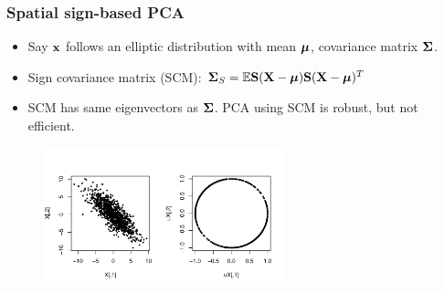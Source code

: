\documentclass[handout,10pt]{beamer}
\begin{document}

\begin{frame}
\frametitle{Spatial sign-based PCA \citep{locantore99}}
\begin{itemize}
\item Say ${\bf{x}}$ follows an elliptic distribution with mean ${\boldsymbol{\mu}}$, covariance matrix ${\boldsymbol{\Sigma}}$.
\item Sign covariance matrix (SCM): ${\boldsymbol{\Sigma}}_S = {\mathbb{E}} {\mathbf{S}} ({\mathbf{X}} - {\boldsymbol{\mu}}){\mathbf{S}} ({\mathbf{X}} - {\boldsymbol{\mu}})^T$
\item SCM has same eigenvectors as ${\boldsymbol{\Sigma}}$. PCA using SCM is robust, but not efficient.
\end{itemize}

\begin{figure}\begin{center}
   \includegraphics[height=4cm]{signs}
   \label{fig:fig2}
\end{center}\end{figure}
\end{frame}

\end{document}
